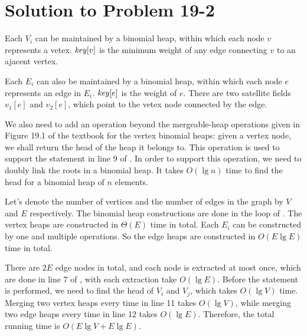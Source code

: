 \documentclass[a4paper, fleqn]{article}
\begin{document}
\section*{Solution to Problem 19-2}

Each $V_i$ can be maintained by a binomial heap, within which each
node $v$ represents a vetex. $\id{key}[v]$ is the minimum weight of
any edge connecting $v$ to an ajacent vertex.

Each $E_i$ can also be maintained by a binomial heap, within which
each node $e$ represents an edge in $E_i$. $\id{key}[e]$ is the weight
of $e$. There are two satellite fields $v_1[e]$ and $v_2[e]$, which
point to the vetex node connected by the edge.

We also need to add an operation beyond the mergeable-heap operations
given in Figure 19.1 of the textbook for the vertex binomial heaps:
given a vertex node, we shall return the head of the heap it belongs
to. This operation is used to support the \If statement in line 9 of
. In order to support this operation, we need to doubly link
the roots in a binomial heap. It takes $O(\lg n)$ time to find the
head for a binomial heap of $n$ elements.

Let's denote the number of vertices and the number of edges in the
graph by $V$ and $E$ respectively. The binomial heap constructions are
done in the \For loop of . The vertex heaps are constructed
in $\Theta(E)$ time in total. Each $E_i$ can be constructed by one
 and multiple  operations. So the edge
heaps are constructed in $O(E \lg E)$ time in total.

There are $2E$ edge nodes in total, and each node is extracted at most
once, which are done in line 7 of , with each extraction
take $O(\lg E)$. Before the \If statement is performed, we need to
find the head of $V_i$ and $V_j$, which takes $O(\lg V)$ time. Merging
two vertex heaps every time in line 11 takes $O(\lg V)$, while merging
two edge heaps every time in line 12 takes $O(\lg E)$. Therefore, the
total running time is $O(E \lg V + E \lg E)$.
\end{document}
